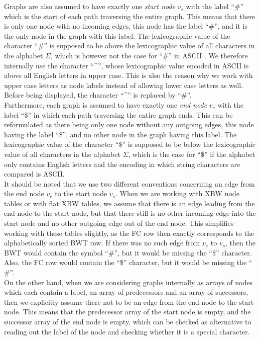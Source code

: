 \documentclass[a4paper,12pt,twoside,BCOR=10mm]{scrbook}
\begin{document}
Graphs are also assumed to have exactly one \textit{start node}\label{def:start_node} $ v_s $ with the label “$\#$” which 
is the start of each path traversing the entire graph. This means that there is only one node with no incoming 
edges, this node has the label “$\#$”, and it is the only node in the graph with this label. 
The lexicographic value of the character “$\#$” is supposed to be above the 
lexicographic value of all characters in the alphabet $ \Sigma $, 
which is however not the case for “$\#$” in ASCII \citep{ASCII}. 
We therefore internally use the character “{\textasciicircum}”, whose lexicographic value encoded in ASCII 
is above all English letters in upper case.\label{hat_instead_of_hashtag} 
This is also the reason why we work with upper case letters as node labels instead of allowing lower case letters as well. 
Before being displayed, the character “{\textasciicircum}” is replaced by “$\#$”. \\
Furthermore, each graph is assumed to have exactly one \textit{end node}\label{def:end_node} $ v_e $ with the label “\$” in which 
each path traversing the entire graph ends. This can be reformulated as there being only one node without any 
outgoing edges, this node having the label “\$”, and no other node in the graph having this label. 
The lexicographic value of the character “\$” is supposed to be below the 
lexicographic value of all characters in the alphabet $ \Sigma $, 
which is the case for “\$” if the alphabet only contains English letters and the encoding in 
which string characters are compared is ASCII. \\
It should be noted that we use two different conventions concerning 
an edge from the end node $ v_e $ to the start node $ v_s $. 
When we are working with XBW node tables or with flat XBW tables, 
we assume that there is an edge leading from the end node to the start node, 
but that there still is no other incoming edge into the start node and no other outgoing edge out of the end node. 
This simplifies working with these tables slightly, as the FC row then exactly corresponds 
to the alphabetically sorted BWT row. 
If there was no such edge from $ v_e $ to $ v_s $, 
then the BWT would contain the symbol “$\#$”, but it would be missing the “\$” character. 
Also, the FC row would contain the “\$” character, but it would be missing the “$\#$”. \\
On the other hand, when we are considering graphs internally as arrays of nodes which 
each contain a label, an array of predecessors and an array of successors, 
then we explicitly assume there not to be an edge from the end node to the start node. 
This means that the predecessor array of the start node is empty, 
and the successor array of the end node is empty, 
which can be checked as alternative to reading out the label of the node and checking 
whether it is a special character.
\end{document}
